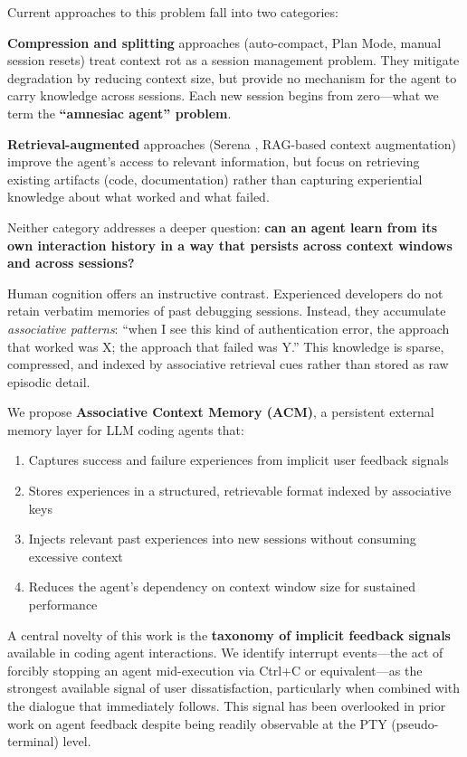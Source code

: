 \documentclass[conference]{IEEEtran}
\begin{document}
Current approaches to this problem fall into two categories:

\textbf{Compression and splitting} approaches (auto-compact, Plan Mode, manual session resets) treat context rot as a session management problem. They mitigate degradation by reducing context size, but provide no mechanism for the agent to carry knowledge across sessions. Each new session begins from zero---what we term the \textbf{``amnesiac agent'' problem}.

\textbf{Retrieval-augmented} approaches (Serena \cite{OraiosAI2025Serena}, RAG-based context augmentation) improve the agent's access to relevant information, but focus on retrieving existing artifacts (code, documentation) rather than capturing experiential knowledge about what worked and what failed.

Neither category addresses a deeper question: \textbf{can an agent learn from its own interaction history in a way that persists across context windows and across sessions?}

Human cognition offers an instructive contrast. Experienced developers do not retain verbatim memories of past debugging sessions. Instead, they accumulate \emph{associative patterns}: ``when I see this kind of authentication error, the approach that worked was X; the approach that failed was Y.'' This knowledge is sparse, compressed, and indexed by associative retrieval cues rather than stored as raw episodic detail.

We propose \textbf{Associative Context Memory (ACM)}, a persistent external memory layer for LLM coding agents that:

\begin{enumerate}
\item Captures success and failure experiences from implicit user feedback signals
\item Stores experiences in a structured, retrievable format indexed by associative keys
\item Injects relevant past experiences into new sessions without consuming excessive context
\item Reduces the agent's dependency on context window size for sustained performance
\end{enumerate}

A central novelty of this work is the \textbf{taxonomy of implicit feedback signals} available in coding agent interactions. We identify interrupt events---the act of forcibly stopping an agent mid-execution via Ctrl+C or equivalent---as the strongest available signal of user dissatisfaction, particularly when combined with the dialogue that immediately follows. This signal has been overlooked in prior work on agent feedback despite being readily observable at the PTY (pseudo-terminal) level.
\end{document}
